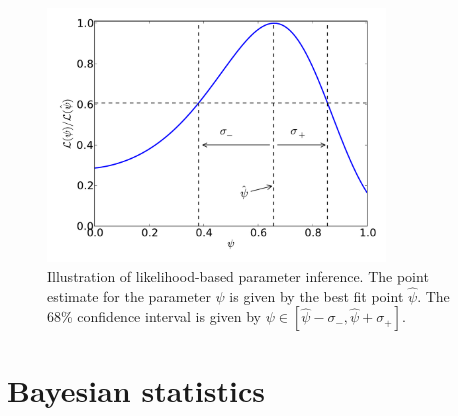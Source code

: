 \begin{figure}[t]
\centering
  \includegraphics[width=0.8\textwidth]{ParamRecon/Likelihood.pdf}
  \caption[Likelihood-based parameter inference]{Illustration of likelihood-based parameter inference. The point estimate for the parameter $\psi$ is given by the best fit point $\hat{\psi}$. The 68\% confidence interval is given by $\psi \in [\hat{\psi} - \sigma_-, \hat{\psi} + \sigma_+]$.}
  \label{fig:parameter:likelihood}
\end{figure}



\section{Bayesian statistics}

